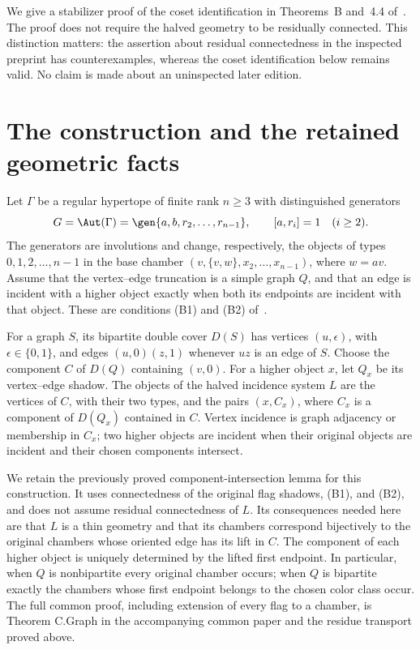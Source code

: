 We give a stabilizer proof of the coset identification in
Theorems~B and~4.4 of~\cite{PT}. The proof does not
require the halved geometry to be residually connected. This distinction
matters: the assertion about residual connectedness in the inspected preprint
has counterexamples, whereas the coset identification below remains
valid. No claim is made about an uninspected later edition.

\section{The construction and the retained geometric facts}
Let $\Gamma$ be a regular hypertope of finite rank $n\ge3$ with
distinguished generators
\[
 G=\Aut(\Gamma)=\gen{a,b,r_2,\ldots,r_{n-1}},
 \qquad [a,r_i]=1\quad(i\ge2).
\]
The generators are involutions and change, respectively, the objects
of types $0,1,2,\ldots,n-1$ in the base chamber
$(v,\{v,w\},x_2,\ldots,x_{n-1})$, where $w=av$.
Assume that the vertex--edge truncation is a simple graph $Q$, and
that an edge is incident with a higher object exactly when both its
endpoints are incident with that object. These are conditions
(B1) and (B2) of~\cite{PT}.

For a graph $S$, its bipartite double cover $D(S)$ has vertices
$(u,\epsilon)$, with $\epsilon\in\{0,1\}$, and edges
$(u,0)(z,1)$ whenever $uz$ is an edge of $S$.
Choose the component $C$ of $D(Q)$ containing $(v,0)$.
For a higher object $x$, let $Q_x$ be its vertex--edge shadow.
The objects of the halved incidence system $L$ are the vertices
of $C$, with their two types, and the pairs $(x,C_x)$, where $C_x$
is a component of $D(Q_x)$ contained in $C$.
Vertex incidence is graph adjacency or membership in $C_x$;
two higher objects are incident when their original objects are
incident and their chosen components intersect.

We retain the previously proved component-intersection lemma for
this construction. It uses connectedness of the original flag
shadows, (B1), and (B2), and does not assume residual connectedness
of $L$. Its consequences needed here are that $L$ is a thin geometry
and that its chambers correspond bijectively to the original
chambers whose oriented edge has its lift in $C$. The component
of each higher object is uniquely determined by the lifted first
endpoint. In particular, when $Q$ is nonbipartite every original
chamber occurs; when $Q$ is bipartite exactly the chambers whose
first endpoint belongs to the chosen color class occur.
The full common proof, including extension of every flag to a
chamber, is Theorem C.Graph in the accompanying common paper and the residue transport proved above.

